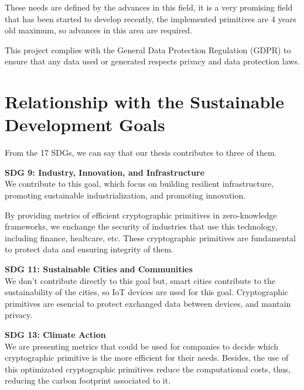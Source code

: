 These needs are defined by the advances in this field, it is a very promising field that has been started to develop recently, the implemented primitives are 4 years old maximum, so advances in this area are required.

This project complies with the General Data Protection Regulation (GDPR) to ensure that any data used or generated respects privacy and data protection laws.

\section*{Relationship with the Sustainable Development Goals}
From the 17 SDGs, we can say that our thesis contributes to three of them.

\textbf{SDG 9: Industry, Innovation, and Infrastructure}\\
We contribute to this goal, which focus on building resilient infrastructure, promoting sustainable industrialization, and promoting innovation.

By providing metrics of efficient cryptographic primitives in zero-knowledge frameworks, we enchange the security of industries that use this technology, including finance, healtcare, etc.
These cryptographic primitives are fundamental to protect data and ensuring integrity of them.

\textbf{SDG 11: Sustainable Cities and Communities}\\
We don't contribute directly to this goal but, smart cities contribute to the sustainability of the cities, so IoT devices are used for this goal. Cryptographic primitives are esencial to protect exchanged data between devices, and mantain privacy.

\textbf{SDG 13: Climate Action}\\
We are presenting metrics that could be used for companies to decide which cryptographic primitive is the more efficient for their needs. Besides, the use of this optimizated cryptographic primitives reduce the computational costs, thus, reducing the carbon footprint associated to it.